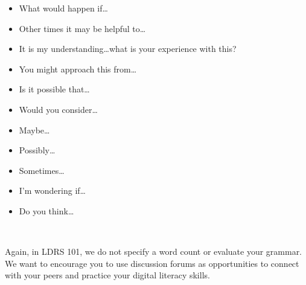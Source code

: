 \documentclass[
]{book}
\providecommand{\tightlist}{%
  \setlength{\itemsep}{0pt}\setlength{\parskip}{0pt}}
\theoremstyle{definition}
\theoremstyle{definition}
\theoremstyle{definition}
\theoremstyle{definition}
\theoremstyle{remark}
\begin{document}
\begin{itemize}
\tightlist
\item
  What would happen if\ldots{}
\item
  Other times it may be helpful to\ldots{}\\
\item
  It is my understanding\ldots what is your experience with this?\\
\item
  You might approach this from\ldots{}\\
\item
  Is it possible that\ldots{}\\
\item
  Would you consider\ldots{}\\
\item
  Maybe\ldots{}\\
\item
  Possibly\ldots{}\\
\item
  Sometimes\ldots{}\\
\item
  I'm wondering if\ldots{}\\
\item
  Do you think\ldots{}
\end{itemize}

{~}

Again, in LDRS 101, we do not specify a word count or evaluate your grammar.~ We want to encourage you to use discussion forums as opportunities to connect with your peers and practice your digital literacy skills.
\end{document}
